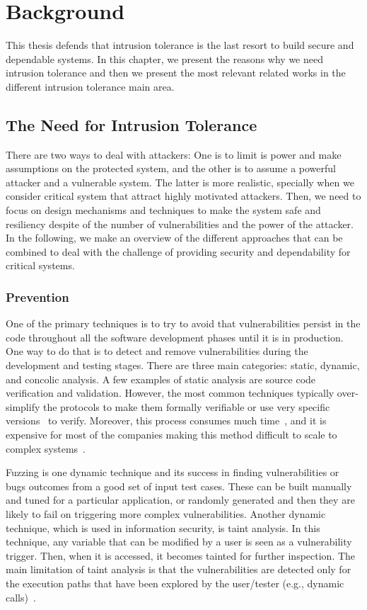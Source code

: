\chapter{Background}
\label{chap:related_work}

This thesis defends that intrusion tolerance is the last resort to build secure and dependable systems.
In this chapter, we present the reasons why we need intrusion tolerance and then we present the most relevant related works in the different intrusion tolerance main area.


\section{The Need for Intrusion Tolerance}
There are two ways to deal with attackers: One is to limit is power and make assumptions on the protected system, and the other is to assume a powerful attacker and a vulnerable system. 
The latter is more realistic, specially when we consider critical system that attract highly motivated attackers. 
Then, we need to focus on design mechanisms and techniques to make the system safe and resiliency despite of the number of vulnerabilities and the power of the attacker.
In the following, we make an overview of the different approaches that can be combined to deal with the challenge of providing security and dependability for critical systems.

\subsection{Prevention}
One of the primary techniques is to try to avoid that vulnerabilities persist in the code throughout all the software development phases until it is in production. 
One way to do that is to detect and remove vulnerabilities during the development and testing stages.
There are three main categories: static, dynamic, and concolic analysis.
A few examples of static analysis are source code verification and validation. 
However, the most common techniques typically over-simplify the protocols to make them formally verifiable or use very specific versions~\cite{Klein:2009,Nelson:2017} to verify. 
Moreover, this process consumes much time~\cite{Klein:2009}, and it is expensive for most of the companies making this method difficult to scale to complex systems~\cite{Giuffrida:2013}.

Fuzzing is one dynamic technique and its success in finding vulnerabilities or bugs outcomes from a good set of input test cases.
These can be built manually and tuned for a particular application, or randomly generated and then they are likely to fail on triggering more complex vulnerabilities.
Another dynamic technique, which is used in information security, is taint analysis.
In this technique, any variable that can be modified by a user is seen as a vulnerability trigger. 
Then, when it is accessed, it becomes tainted for further inspection.
The main limitation of taint analysis is that the vulnerabilities are detected only for the execution paths that have been explored by the user/tester (e.g., dynamic calls)~\cite{Yamaguchi:2015}.

